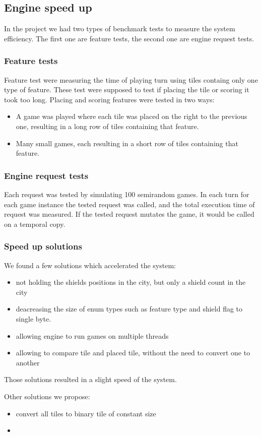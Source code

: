 \subsection{Engine speed up}

In the project we had two types of benchmark tests to measure the system efficiency. The first one are feature tests, the second one are engine request tests.

\subsubsection{Feature tests}
Feature test were measuring the time of playing turn using tiles containg only one type of feature. These test were supposed to test if placing the tile or scoring it took too long. Placing and scoring features were tested in two ways:
\begin{itemize}
	\item A game was played where each tile was placed on the right to the previous one, resulting in a long row of tiles containing that feature.
	\item Many small games, each resulting in a short row of tiles containing that feature.
\end{itemize} 

\subsubsection{Engine request tests}
Each request was tested by simulating 100 semirandom games. In each turn for each game instance the tested request was called, and the total execution time of request was measured. If the tested request mutates the game, it would be called on a temporal copy.

\subsubsection{Speed up solutions}
We found a few solutions which  accelerated the system:
\begin{itemize}
	\item not holding the shields positions in the city, but only a shield count in the city
	\item deacreasing the size of enum types such as feature type and shield flag to single byte.
	\item allowing engine to run games on multiple threads
	\item allowing to compare tile and placed tile, without the need to convert one to another
\end{itemize} 

Those solutions resulted in a slight speed of the system.

Other solutions we propose:
\begin{itemize}
	\item convert all tiles to binary tile of constant size
	\item 
\end{itemize} 



